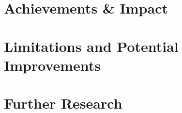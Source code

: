 %  
%

\section{ Achievements \& Impact}

\section{ Limitations and Potential Improvements }

\section{ Further Research }
